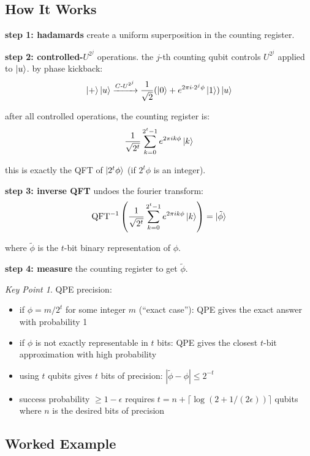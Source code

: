 \documentclass[11pt,a4paper]{article}
\theoremstyle{definition}
\theoremstyle{remark}
\newtheorem*{keypoint}{Key Point}
\begin{document}
\subsection{How It Works}

\textbf{step 1: hadamards} create a uniform superposition in the counting register.

\textbf{step 2: controlled-$U^{2^j}$} operations. the $j$-th counting qubit controls $U^{2^j}$ applied to $\ket{u}$. by phase kickback:
\[
\ket{+}\ket{u} \xrightarrow{C\text{-}U^{2^j}} \frac{1}{\sqrt{2}}(\ket{0} + e^{2\pi i \cdot 2^j \phi}\ket{1})\ket{u}
\]

after all controlled operations, the counting register is:
\[
\frac{1}{\sqrt{2^t}}\sum_{k=0}^{2^t-1} e^{2\pi i k\phi}\ket{k}
\]

this is exactly the QFT of $\ket{2^t \phi}$ (if $2^t\phi$ is an integer).

\textbf{step 3: inverse QFT} undoes the fourier transform:
\[
\text{QFT}^{-1}\left(\frac{1}{\sqrt{2^t}}\sum_{k=0}^{2^t-1} e^{2\pi i k\phi}\ket{k}\right) = \ket{\tilde{\phi}}
\]

where $\tilde{\phi}$ is the $t$-bit binary representation of $\phi$.

\textbf{step 4: measure} the counting register to get $\tilde{\phi}$.

\begin{keypoint}
QPE precision:
\begin{itemize}
    \item if $\phi = m/2^t$ for some integer $m$ (``exact case''): QPE gives the exact answer with probability 1
    \item if $\phi$ is not exactly representable in $t$ bits: QPE gives the closest $t$-bit approximation with high probability
    \item using $t$ qubits gives $t$ bits of precision: $|\tilde{\phi} - \phi| \leq 2^{-t}$
    \item success probability $\geq 1 - \epsilon$ requires $t = n + \lceil\log(2 + 1/(2\epsilon))\rceil$ qubits where $n$ is the desired bits of precision
\end{itemize}
\end{keypoint}

\subsection{Worked Example}
\end{document}
